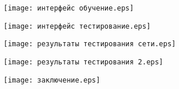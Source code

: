 \begin{landscape}
\begin{плакат}
	\texttt{[image: интерфейс обучение.eps]}
	\label{pl8:image}      
\end{плакат}

\begin{плакат}
	\texttt{[image: интерфейс тестирование.eps]}
	\label{pl9:image}      
\end{плакат}

\begin{плакат}
	\texttt{[image: результаты тестирования сети.eps]}
	\label{pl10:image}      
\end{плакат}

\begin{плакат}
	\texttt{[image: результаты тестирования 2.eps]}
	\label{pl13:image}      
\end{плакат}

\begin{плакат}
	\texttt{[image: заключение.eps]}
	\label{pl11:image}      
\end{плакат}

\end{landscape}
